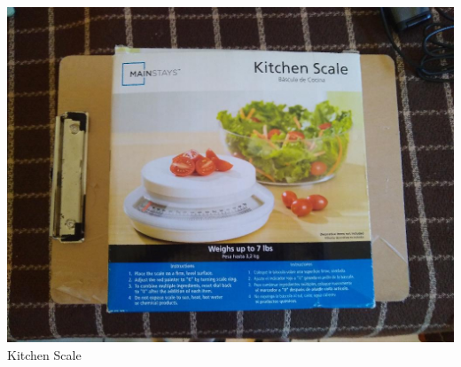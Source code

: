 \documentclass[t]{beamer}
\newcommand{\htarget}[2]{\hypertarget{#1}{#2}}
\begin{document}
\begin{frame}\htarget{scale}{} \begin{center}
\includegraphics[height=0.8\textheight]{kitchen_scale_mini.jpg} \\
Kitchen Scale
\end{center} \end{frame}
\end{document}
